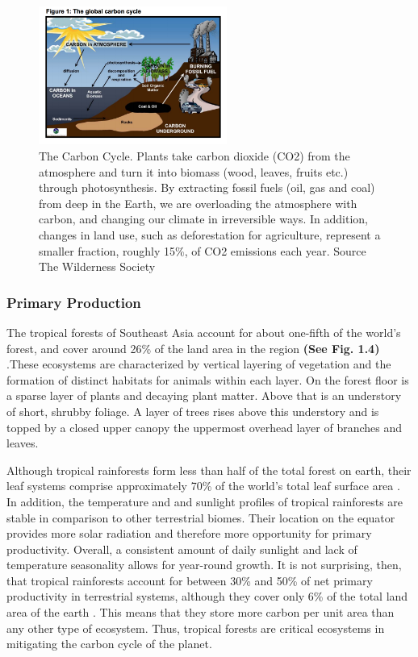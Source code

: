     \begin{figure}[ht]
    \centering
        \includegraphics[width = 0.55\textwidth]{graphics/carboncycle.png}
        \caption{The Carbon Cycle. Plants take carbon dioxide (CO2) from the atmosphere and turn it into biomass (wood, leaves, fruits etc.) through photosynthesis. By extracting fossil fuels (oil, gas and coal) from deep in the Earth, we are overloading the atmosphere with carbon, and changing our climate in irreversible ways. In addition, changes in land use, such as deforestation for agriculture, represent a smaller fraction, roughly 15\%, of CO2 emissions each year. Source The Wilderness Society}
    \end{figure}


\subsubsection{Primary Production}


  
  
  
  The tropical forests of Southeast Asia account for about one-fifth of the world's forest, and cover around 26\% of the land area in the region \textbf{(See Fig. 1.4)} \citep{brown2003state}.These ecosystems are characterized by vertical layering of vegetation and the formation of distinct habitats for animals within each layer. On the forest floor is a sparse layer of plants and decaying plant matter. Above that is an understory of short, shrubby foliage. A layer of trees rises above this understory and is topped by a closed upper canopy the uppermost overhead layer of branches and leaves.
  
Although tropical rainforests form less than half of the total forest on earth, their leaf systems comprise approximately 70\% of the world's total leaf surface area \citep{gower1999direct}. In addition, the temperature and and sunlight profiles of tropical rainforests are stable in comparison to other terrestrial biomes. Their location on the equator provides more solar radiation and therefore more opportunity for primary productivity. Overall, a consistent amount of daily sunlight and lack of temperature seasonality allows for year-round growth.   It is not surprising, then, that tropical rainforests account for between 30\% and 50\% of net primary productivity in terrestrial systems, although they cover only 6\% of the total land area of the earth \citep{houghton2005aboveground}. This means that they store more carbon per unit area than any other type of ecosystem. Thus, tropical forests are critical ecosystems in mitigating the carbon cycle of the planet. 
  
